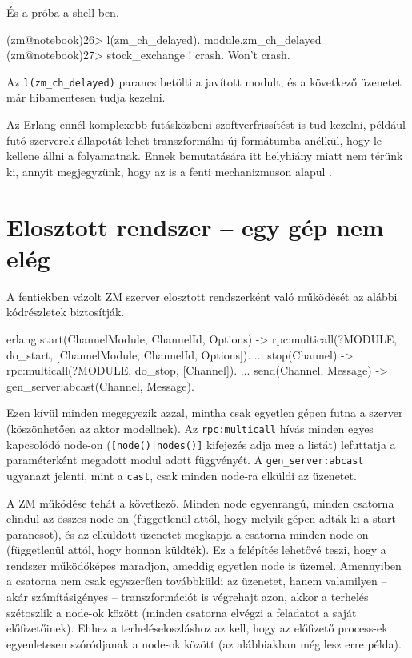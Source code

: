 \documentclass[12pt, a4paper, oneside]{book}
\begin{document}
És a próba a shell-ben.

\begin{code}{}{}
(zm@notebook)26> l(zm_ch_delayed).               
{module,zm_ch_delayed}
(zm@notebook)27> stock_exchange ! crash.
Won't crash.
\end{code}

Az \texttt{l(zm\_ch\_delayed)} parancs betölti a javított modult, és a
következő üzenetet már hibamentesen tudja kezelni.

Az Erlang ennél komplexebb futásközbeni szoftverfrissítést is tud kezelni,
például futó szerverek állapotát lehet transzformálni új formátumba anélkül,
hogy le kellene állni a folyamatnak. Ennek bemutatására itt helyhiány miatt nem
térünk ki, annyit megjegyzünk, hogy az is a fenti mechanizmuson alapul
\citep{OTPInAction}.

\section{Elosztott rendszer -- egy gép nem elég}
A fentiekben vázolt ZM szerver elosztott rendszerként való működését az alábbi
kódrészletek biztosítják.

\begin{code}{erlang}{}
start(ChannelModule, ChannelId, Options) ->
  rpc:multicall(?MODULE, do_start, 
                  [ChannelModule, ChannelId, Options]).
...
stop(Channel) ->
  rpc:multicall(?MODULE, do_stop, [Channel]).
...
send(Channel, Message) ->
  gen_server:abcast(Channel, Message).
\end{code}

Ezen kívül minden megegyezik azzal, mintha csak egyetlen gépen futna a szerver
(köszönhetően az aktor modellnek). Az \texttt{rpc:multicall} hívás minden egyes
kapcsolódó node-on (\texttt{[node()|nodes()]} kifejezés adja meg a listát)
lefuttatja a paraméterként megadott modul adott függvényét. A
\texttt{gen\_server:abcast} ugyanazt jelenti, mint a \texttt{cast}, csak minden
node-ra elküldi az üzenetet.

A ZM működése tehát a következő. Minden node egyenrangú, minden csatorna elindul
az összes node-on (függetlenül attól, hogy melyik gépen adták ki a start
parancsot), és az elküldött üzenetet megkapja a csatorna minden node-on
(függetlenül attól, hogy honnan küldték). Ez a felépítés lehetővé teszi, hogy a
rendszer működőképes maradjon, ameddig egyetlen node is üzemel. Amennyiben a
csatorna nem csak egyszerűen továbbküldi az üzenetet, hanem valamilyen -- akár
számításigényes -- transzformációt is végrehajt azon, akkor a terhelés
szétoszlik a node-ok között (minden csatorna elvégzi a feladatot a saját
előfizetőinek). Ehhez a terheléseloszláshoz az kell, hogy az előfizető
process-ek egyenletesen szóródjanak a node-ok között (az alábbiakban még lesz
erre példa).
\end{document}
